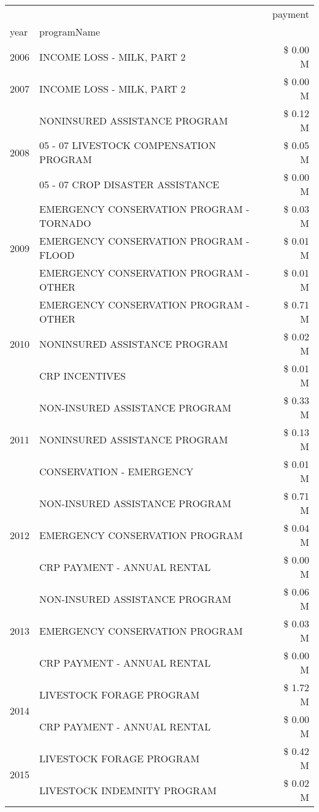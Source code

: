 \begin{tabular}{llr}
\toprule
 &  & payment \\
year & programName &  \\
\midrule
2006 & INCOME LOSS - MILK, PART 2 & \$ 0.00 M \\
\cline{1-3}
2007 & INCOME LOSS - MILK, PART 2 & \$ 0.00 M \\
\cline{1-3}
\multirow[t]{3}{*}{2008} & NONINSURED ASSISTANCE PROGRAM & \$ 0.12 M \\
 & 05 - 07 LIVESTOCK COMPENSATION PROGRAM & \$ 0.05 M \\
 & 05 - 07 CROP DISASTER ASSISTANCE & \$ 0.00 M \\
\cline{1-3}
\multirow[t]{3}{*}{2009} & EMERGENCY CONSERVATION PROGRAM - TORNADO & \$ 0.03 M \\
 & EMERGENCY CONSERVATION PROGRAM - FLOOD & \$ 0.01 M \\
 & EMERGENCY CONSERVATION PROGRAM - OTHER & \$ 0.01 M \\
\cline{1-3}
\multirow[t]{3}{*}{2010} & EMERGENCY CONSERVATION PROGRAM - OTHER & \$ 0.71 M \\
 & NONINSURED ASSISTANCE PROGRAM & \$ 0.02 M \\
 & CRP INCENTIVES & \$ 0.01 M \\
\cline{1-3}
\multirow[t]{3}{*}{2011} & NON-INSURED ASSISTANCE PROGRAM & \$ 0.33 M \\
 & NONINSURED ASSISTANCE PROGRAM & \$ 0.13 M \\
 & CONSERVATION - EMERGENCY & \$ 0.01 M \\
\cline{1-3}
\multirow[t]{3}{*}{2012} & NON-INSURED ASSISTANCE PROGRAM & \$ 0.71 M \\
 & EMERGENCY CONSERVATION PROGRAM & \$ 0.04 M \\
 & CRP PAYMENT - ANNUAL RENTAL & \$ 0.00 M \\
\cline{1-3}
\multirow[t]{3}{*}{2013} & NON-INSURED ASSISTANCE PROGRAM & \$ 0.06 M \\
 & EMERGENCY CONSERVATION PROGRAM & \$ 0.03 M \\
 & CRP PAYMENT - ANNUAL RENTAL & \$ 0.00 M \\
\cline{1-3}
\multirow[t]{2}{*}{2014} & LIVESTOCK FORAGE PROGRAM & \$ 1.72 M \\
 & CRP PAYMENT - ANNUAL RENTAL & \$ 0.00 M \\
\cline{1-3}
\multirow[t]{3}{*}{2015} & LIVESTOCK FORAGE PROGRAM & \$ 0.42 M \\
 & LIVESTOCK INDEMNITY PROGRAM & \$ 0.02 M \\

\end{tabular}
